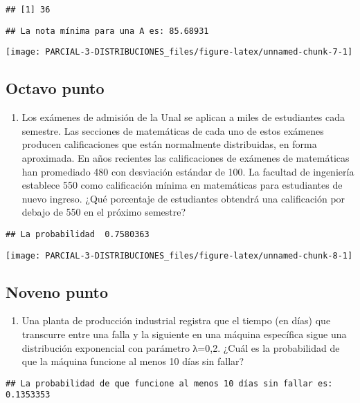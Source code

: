 \documentclass[
]{article}
\providecommand{\tightlist}{%
  \setlength{\itemsep}{0pt}\setlength{\parskip}{0pt}}
\begin{document}
\begin{verbatim}
## [1] 36
\end{verbatim}

\begin{verbatim}
## La nota mínima para una A es: 85.68931
\end{verbatim}

\begin{center}\texttt{[image: PARCIAL-3-DISTRIBUCIONES\_files/figure-latex/unnamed-chunk-7-1]} \end{center}

\subsection{Octavo punto}\label{octavo-punto}

\begin{enumerate}
\def\labelenumi{\arabic{enumi}.}
\setcounter{enumi}{7}
\tightlist
\item
  Los exámenes de admisión de la Unal se aplican a miles de estudiantes
  cada semestre. Las secciones de matemáticas de cada uno de estos
  exámenes producen calificaciones que están normalmente distribuidas,
  en forma aproximada. En años recientes las calificaciones de exámenes
  de matemáticas han promediado 480 con desviación estándar de 100. La
  facultad de ingeniería establece 550 como calificación mínima en
  matemáticas para estudiantes de nuevo ingreso. ¿Qué porcentaje de
  estudiantes obtendrá una calificación por debajo de 550 en el próximo
  semestre?
\end{enumerate}

\begin{verbatim}
## La probabilidad  0.7580363
\end{verbatim}

\begin{center}\texttt{[image: PARCIAL-3-DISTRIBUCIONES\_files/figure-latex/unnamed-chunk-8-1]} \end{center}

\subsection{Noveno punto}\label{noveno-punto}

\begin{enumerate}
\def\labelenumi{\arabic{enumi}.}
\setcounter{enumi}{8}
\tightlist
\item
  Una planta de producción industrial registra que el tiempo (en días)
  que transcurre entre una falla y la siguiente en una máquina
  específica sigue una distribución exponencial con parámetro λ=0,2.
  ¿Cuál es la probabilidad de que la máquina funcione al menos 10 días
  sin fallar?
\end{enumerate}

\begin{verbatim}
## La probabilidad de que funcione al menos 10 días sin fallar es: 0.1353353
\end{verbatim}
\end{document}
